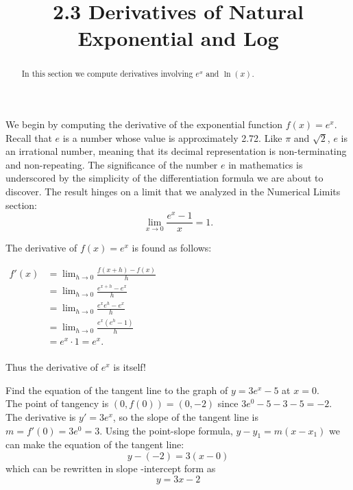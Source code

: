 \documentclass{ximera}
\title{2.3 Derivatives of Natural Exponential and Log}
\begin{document}
\begin{abstract}
In this section we compute derivatives involving $e^x$ and $\ln(x)$.
\end{abstract}

\maketitle






We begin by computing the derivative of the exponential function $f(x) = e^x$.  
Recall that $e$ is a number whose value is approximately 2.72.
Like $\pi$ and $\sqrt 2$, $e$ is an irrational number, meaning that its decimal representation 
is non-terminating and non-repeating. The significance of the number $e$ in mathematics
is underscored by the simplicity of the differentiation formula we are about to discover. 
The result hinges on a limit that we analyzed in the Numerical Limits section:
\[
\lim_{x \to 0} \frac{e^x - 1}{x} = 1.
\]

The derivative of $f(x) = e^x$ is found as follows:

\begin{center}
$\begin{aligned}
f'(x) &= \lim_{h \to 0} \frac{f(x+h)-f(x)}{h} \\[5pt]
&= \lim_{h \to 0}\frac{e^{x+h}-e^x}{h}\\[5pt]
&= \lim_{h \to 0} \frac{e^x e^h-e^x}{h}\\[5pt]
&= \lim_{h \to 0} \frac{e^x (e^h-1)}{h}\\[5pt]
&= e^x \cdot 1 = e^x.\\[-5pt]
\end{aligned}$
\end{center}

Thus the derivative of $e^x$ is itself!


\begin{example}[example 1] Find the equation of the tangent line to the graph of $y = 3e^x - 5$ at $x = 0$.\\
The point of tangency is $(0, f(0)) = (0, -2)$ since $3e^0 -5 - 3-5 = -2$. 
The derivative is $y' = 3e^x$, so the slope of the tangent line is $m = f'(0) = 3e^0 = 3$.
Using the point-slope formula, $y - y_1 = m(x-x_1)$ we can make the equation of the tangent line:
\[
y - (-2) = 3(x-0)
\]
which can be rewritten in slope -intercept form as
\[
y = 3x-2
\]
\end{example}
\end{document}
